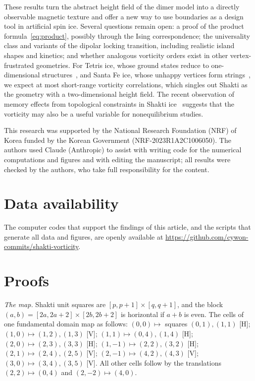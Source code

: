 \documentclass[aps,prb,twocolumn,floatfix,longbibliography]{revtex4-2}
\begin{document}
These results turn the abstract height field of the dimer model into a directly observable magnetic texture and offer a new way to use boundaries as a design tool in artificial spin ice. Several questions remain open: a proof of the product formula~\eqref{eq:product}, possibly through the Ising correspondence; the universality class and variants of the dipolar locking transition, including realistic island shapes and kinetics; and whether analogous vorticity orders exist in other vertex-frustrated geometries. For Tetris ice, whose ground states reduce to one-dimensional structures~\cite{Gilbert2016}, and Santa Fe ice, whose unhappy vertices form strings~\cite{Zhang2021}, we expect at most short-range vorticity correlations, which singles out Shakti as the geometry with a two-dimensional height field. The recent observation of memory effects from topological constraints in Shakti ice~\cite{Priyanka2025} suggests that the vorticity may also be a useful variable for nonequilibrium studies.

\begin{acknowledgments}
This research was supported by the National Research Foundation (NRF) of Korea funded by the Korean Government (NRF-2023R1A2C1006050). The authors used Claude (Anthropic) to assist with writing code for the numerical computations and figures and with editing the manuscript; all results were checked by the authors, who take full responsibility for the content.
\end{acknowledgments}

\section*{Data availability}
The computer codes that support the findings of this article, and the scripts that generate all data and figures, are openly available at \url{https://github.com/cywon-commits/shakti-vorticity}.

\appendix

\section{Proofs}
\label{app:proofs}

\emph{The map.} Shakti unit squares are $[p,p+1]\times[q,q+1]$, and the block $(a,b)=[2a,2a+2]\times[2b,2b+2]$ is horizontal if $a+b$ is even. The cells of one fundamental domain map as follows: $(0,0)\mapsto$ squares $(0,1),(1,1)$ [H]; $(1,0)\mapsto(1,2),(1,3)$ [V]; $(1,1)\mapsto(0,4),(1,4)$ [H]; $(2,0)\mapsto(2,3),(3,3)$ [H]; $(1,-1)\mapsto(2,2),(3,2)$ [H]; $(2,1)\mapsto(2,4),(2,5)$ [V]; $(2,-1)\mapsto(4,2),(4,3)$ [V]; $(3,0)\mapsto(3,4),(3,5)$ [V]. All other cells follow by the translations $(2,2)\mapsto(0,4)$ and $(2,-2)\mapsto(4,0)$.
\end{document}
